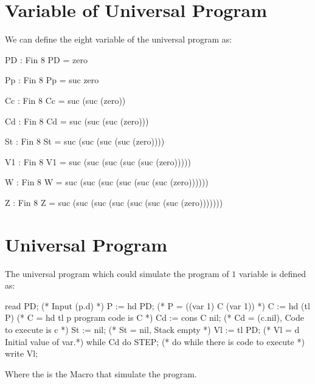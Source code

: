 \section{Variable of Universal \WHILE Program}\label{appendix:variable of u}
We can define the eight variable of the universal \WHILE program as:
\begin{code}[fontsize=\footnotesize]
PD : Fin 8
PD = zero

Pp : Fin 8
Pp = suc zero

Cc : Fin 8
Cc = suc (suc (zero))

Cd : Fin 8
Cd = suc (suc (suc (zero)))

St : Fin 8
St = suc (suc (suc (suc (zero))))

V1 : Fin 8
V1 = suc (suc (suc (suc (suc (zero)))))

W : Fin 8
W = suc (suc (suc (suc (suc (suc (zero))))))

Z : Fin 8
Z = suc (suc (suc (suc (suc (suc (suc (zero)))))))
\end{code}
\section{Universal \WHILE Program}\label{appendix:universal while}
The universal \WHILE program which could simulate the \WHILE program of $1$ variable is defined as:
\begin{code}
read PD;             (* Input (p.d) *)
  P := hd PD;        (* P = ((var 1) C (var 1)) *)
  C := hd (tl P)     (* C = hd tl p program code is C *)
  Cd := cons C nil;  (* Cd = (c.nil), Code to execute is c *)
  St := nil;         (* St = nil, Stack empty *)
  Vl := tl PD;       (* Vl = d Initial value of var.*)
  while Cd do STEP;  (* do while there is code to execute *)
write Vl;
\end{code}
Where the  is the Macro that simulate the program.
